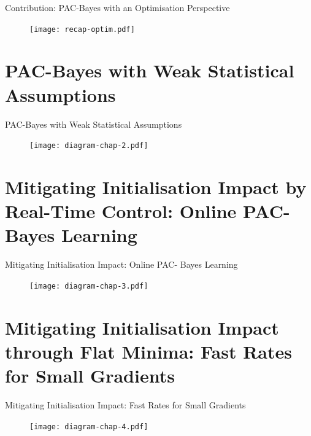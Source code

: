 \documentclass{presentation}
\begin{document}
  \begin{xframe}{Contribution: PAC-Bayes with an Optimisation Perspective }
    \begin{figure}
        \centering
        \texttt{[image: recap-optim.pdf]}
    \end{figure}
  \end{xframe}


\section{PAC-Bayes with Weak Statistical Assumptions}

\begin{xframe}{PAC-Bayes with Weak Statistical Assumptions}
  \begin{figure}
      \centering
      \texttt{[image: diagram-chap-2.pdf]}
  \end{figure}
\end{xframe}


\section{Mitigating Initialisation Impact by Real-Time Control: Online PAC- Bayes Learning}

\begin{xframe}{Mitigating Initialisation Impact: Online PAC- Bayes Learning}
    \begin{figure}
        \centering
        \texttt{[image: diagram-chap-3.pdf]}
    \end{figure}
  \end{xframe}


\section{Mitigating Initialisation Impact through Flat Minima: Fast Rates for Small Gradients}

\begin{xframe}{Mitigating Initialisation Impact: Fast Rates for Small Gradients}
    \begin{figure}
        \centering
        \texttt{[image: diagram-chap-4.pdf]}
    \end{figure}
  \end{xframe}
\end{document}
